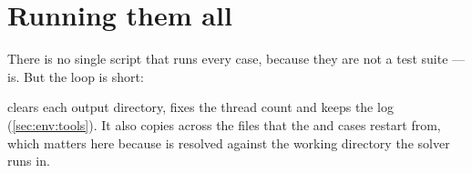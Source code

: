 \section{Running them all}
\label{sec:cases:runall}

There is no single script that runs every case, because they are not a test
suite ---  is. But the loop is short:


 clears each output directory, fixes the thread count
and keeps the log (\cref{sec:env:tools}). It also copies across the 
files that the  and  cases restart from, which
matters here because  is resolved against the working
directory the solver runs in.
